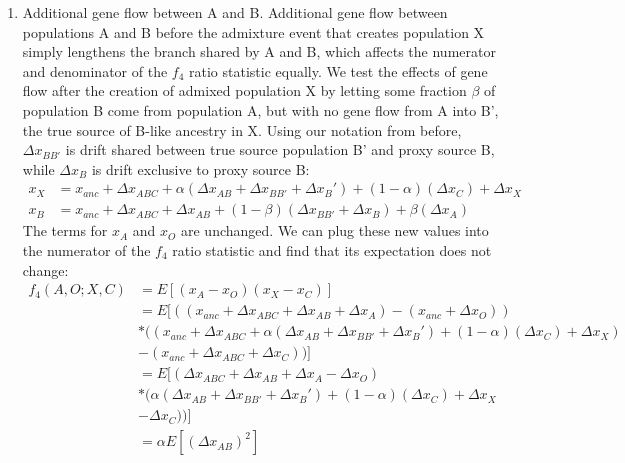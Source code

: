 \documentclass[12pt]{report}
\begin{document}
\begin{enumerate}
	\item Additional gene flow between A and B. %
	Additional gene flow between populations A and B before the admixture event that creates population X simply lengthens the branch shared by A and B, which affects the numerator and denominator of the $f_4$ ratio statistic equally. We test the effects of gene flow after the creation of admixed population X by letting some fraction $\beta$ of population B come from population A, but with no gene flow from A into B', the true source of B-like ancestry in X. Using our notation from before, $\Delta{x_{BB'}}$ is drift shared between true source population B' and proxy source B, while $\Delta{x_B}$ is drift exclusive to proxy source B:
	\begin{align*}
	x_X &= x_{anc} + \Delta{x_{ABC}} + \alpha(\Delta{x_{AB}} + \Delta{x_{BB'}} + \Delta{x_B'}) + (1 - \alpha)(\Delta{x_{C}}) + \Delta{x_X} \\
	x_B &= x_{anc} + \Delta{x_{ABC}} + \Delta{x_{AB}} + (1 - \beta)(\Delta{x_{BB'}} + \Delta{x_{B}}) + \beta(\Delta{x_{A}})
	\end{align*}
	The terms for $x_A$ and $x_O$ are unchanged. We can plug these new values into the numerator of the $f_4$ ratio statistic and find that its expectation does not change:
	\begin{align*}
	f_4(A,O;X,C) &= E[(x_A - x_O)(x_X - x_C)] \\
	&= E[((x_{anc} + \Delta{x_{ABC}} + \Delta{x_{AB}} + \Delta{x_{A}}) - (x_{anc} + \Delta{x_{O}}))\\
	&*((x_{anc} + \Delta{x_{ABC}} + \alpha(\Delta{x_{AB}} + \Delta{x_{BB'}} + \Delta{x_B'}) + (1 - \alpha)(\Delta{x_{C}}) + \Delta{x_X}) \\
	&- (x_{anc} + \Delta{x_{ABC}} + \Delta{x_C}))] \\
	&= E[(\Delta{x_{ABC}} + \Delta{x_{AB}} + \Delta{x_{A}} - \Delta{x_{O}})\\
	&*(\alpha(\Delta{x_{AB}} + \Delta{x_{BB'}} + \Delta{x_B'}) + (1 - \alpha)(\Delta{x_{C}}) + \Delta{x_X} \\
	&- \Delta{x_C}))]\\
	&=\alpha E[(\Delta{x_{AB}})^2]
	\end{align*}
	

\end{enumerate}
\end{document}
